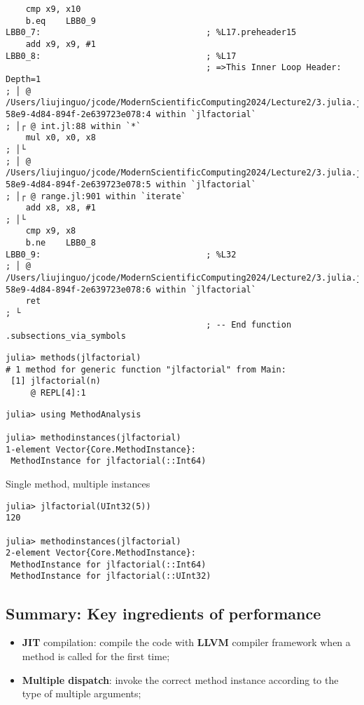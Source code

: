 \documentclass[
  notoc %
]{tufte-book}
\providecommand{\tightlist}{%
  \setlength{\itemsep}{0pt}\setlength{\parskip}{0pt}
}
\begin{document}
\begin{lstlisting}
    cmp x9, x10
    b.eq    LBB0_9
LBB0_7:                                 ; %L17.preheader15
    add x9, x9, #1
LBB0_8:                                 ; %L17
                                        ; =>This Inner Loop Header: Depth=1
; │ @ /Users/liujinguo/jcode/ModernScientificComputing2024/Lecture2/3.julia.jl#==#d2429055-58e9-4d84-894f-2e639723e078:4 within `jlfactorial`
; │┌ @ int.jl:88 within `*`
    mul x0, x0, x8
; │└
; │ @ /Users/liujinguo/jcode/ModernScientificComputing2024/Lecture2/3.julia.jl#==#d2429055-58e9-4d84-894f-2e639723e078:5 within `jlfactorial`
; │┌ @ range.jl:901 within `iterate`
    add x8, x8, #1
; │└
    cmp x9, x8
    b.ne    LBB0_8
LBB0_9:                                 ; %L32
; │ @ /Users/liujinguo/jcode/ModernScientificComputing2024/Lecture2/3.julia.jl#==#d2429055-58e9-4d84-894f-2e639723e078:6 within `jlfactorial`
    ret
; └
                                        ; -- End function
.subsections_via_symbols
\end{lstlisting}

\begin{lstlisting}
julia> methods(jlfactorial)
# 1 method for generic function "jlfactorial" from Main:
 [1] jlfactorial(n)
     @ REPL[4]:1
\end{lstlisting}

\begin{lstlisting}
julia> using MethodAnalysis

julia> methodinstances(jlfactorial)
1-element Vector{Core.MethodInstance}:
 MethodInstance for jlfactorial(::Int64)
\end{lstlisting}

Single method, multiple instances

\begin{lstlisting}
julia> jlfactorial(UInt32(5))
120

julia> methodinstances(jlfactorial)
2-element Vector{Core.MethodInstance}:
 MethodInstance for jlfactorial(::Int64)
 MethodInstance for jlfactorial(::UInt32)
\end{lstlisting}

\hypertarget{summary-key-ingredients-of-performance}{%
\subsection{Summary: Key ingredients of
performance}\label{summary-key-ingredients-of-performance}}

\begin{itemize}
\tightlist
\item
  \textbf{JIT} compilation: compile the code with \textbf{LLVM} compiler
  framework when a method is called for the first time;
\item
  \textbf{Multiple dispatch}: invoke the correct method instance
  according to the type of multiple arguments;
\end{itemize}
\end{document}
